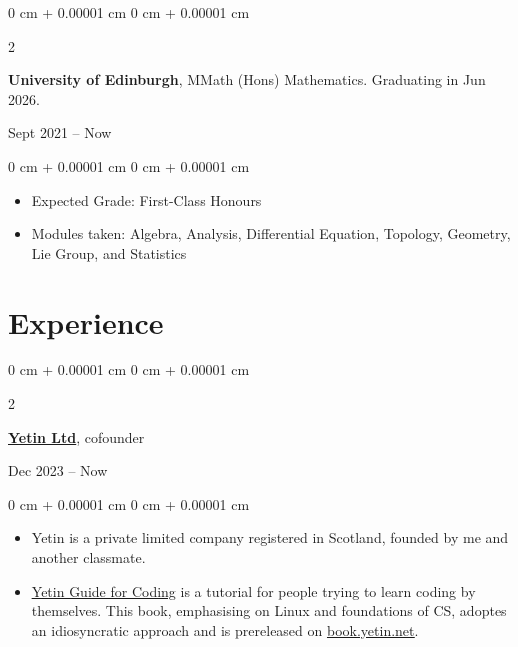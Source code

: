 \documentclass[10pt, a4paper]{article}
\newenvironment{highlights}{
    \begin{itemize}[
        topsep=0.10 cm,
        parsep=0.10 cm,
        partopsep=0pt,
        itemsep=0pt,
        leftmargin=0 cm + 10pt
    ]
}{
    \end{itemize}
} %
\newenvironment{onecolentry}{
    \begin{adjustwidth}{
        0 cm + 0.00001 cm
    }{
        0 cm + 0.00001 cm
    }
}{
    \end{adjustwidth}
} %
\newenvironment{twocolentry}[2][]{
    \onecolentry
    \def\secondColumn{#2}
    \setcolumnwidth{\fill, 4.5 cm}
    \begin{paracol}{2}
}{
    \switchcolumn \raggedleft \secondColumn
    \end{paracol}
    \endonecolentry
} %
\begin{document}
        \begin{twocolentry}{
            Sept 2021 – Now
        }
            \textbf{University of Edinburgh}, MMath (Hons) Mathematics. Graduating in Jun 2026.
		\end{twocolentry}

        \vspace{0.10 cm}
        \begin{onecolentry}
            \begin{highlights}
                \item Expected Grade: First-Class Honours
                \item Modules taken: Algebra, Analysis, Differential Equation, Topology, Geometry, Lie Group, and Statistics
            \end{highlights}
        \end{onecolentry}

    
    \section{Experience}

        \begin{twocolentry}{
            Dec 2023 – Now
        }
			\href{https://yetin.net}{\textbf{\underline{Yetin Ltd}}}, cofounder
		\end{twocolentry}
        \vspace{0.10 cm}
        \begin{onecolentry}
            \begin{highlights}
				\item Yetin is a private limited company registered in Scotland, founded by me and another classmate.
				\item \href{https://book.yetin.net}{\underline{Yetin Guide for Coding}} is
					a tutorial for people trying to learn coding by themselves. 
					This book, emphasising on Linux and foundations of CS, adoptes an idiosyncratic approach and is prereleased on \href{https://book.yetin.net}{\underline{book.yetin.net}}.
            \end{highlights}
        \end{onecolentry}

        \vspace{0.2 cm}
\end{document}
